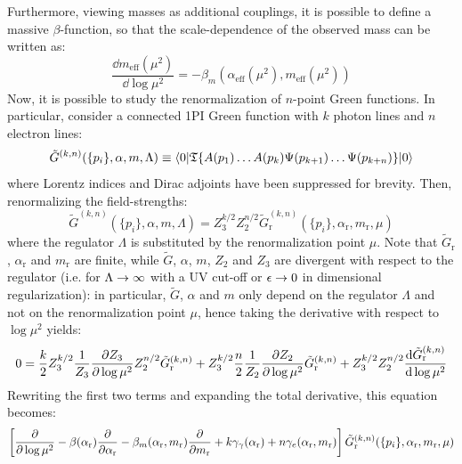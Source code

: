 Furthermore, viewing masses as additional couplings, it is possible to define a massive $ \beta $-function, so that the scale-dependence of the observed mass can be written as:
\begin{equation}
  \frac{\dd m_\text{eff}(\mu^2)}{\dd \log \mu^2} = - \beta_m(\alpha_\text{eff}(\mu^2) , m_\text{eff}(\mu^2))
\end{equation}
Now, it is possible to study the renormalization of $ n $-point Green functions. In particular, consider a connected 1PI Green function with $ k $ photon lines and $ n $ electron lines:
\begin{equation*}
  \tilde{G}^{(k,n)}(\{p_i\} , \alpha , m , \Lambda) \equiv \braket{0 | \mathfrak{T}\{A(p_1) \dots A(p_k) \Psi(p_{k + 1}) \dots \Psi(p_{k + n}) \} | 0}
\end{equation*}
where Lorentz indices and Dirac adjoints have been suppressed for brevity. Then, renormalizing the field-strengths:
\begin{equation*}
  \tilde{G}^{(k,n)}(\{p_i\} , \alpha , m , \Lambda) = Z_3^{k/2} Z_2^{n/2} \tilde{G}_\text{r}^{(k,n)}(\{p_i\} , \alpha_\text{r} , m_\text{r} , \mu)
\end{equation*}
where the regulator $ \Lambda $ is substituted by the renormalization point $ \mu $. Note that $ \tilde{G}_\text{r} $, $ \alpha_\text{r} $ and $ m_\text{r} $ are finite, while $ \tilde{G} $, $ \alpha $, $ m $, $ Z_2 $ and $ Z_3 $ are divergent with respect to the regulator (i.e. for $ \Lambda \rightarrow \infty $ with a UV cut-off or $ \epsilon \rightarrow 0 $ in dimensional regularization): in particular, $ \tilde{G} $, $ \alpha $ and $ m $ only depend on the regulator $ \Lambda $ and not on the renormalization point $ \mu $, hence taking the derivative with respect to $ \log \mu^2 $ yields:
\begin{equation*}
  0 = \frac{k}{2} Z_3^{k/2} \frac{1}{Z_3} \frac{\partial Z_3}{\partial \log \mu^2} Z_2^{n/2} \tilde{G}_\text{r}^{(k,n)} + Z_3^{k/2} \frac{n}{2} \frac{1}{Z_2} \frac{\partial Z_2}{\partial \log \mu^2} \tilde{G}_\text{r}^{(k,n)} + Z_3^{k/2} Z_2^{n/2} \frac{\mathrm{d} \tilde{G}_\text{r}^{(k,n)}}{\mathrm{d} \log \mu^2}
\end{equation*}
Rewriting the first two terms and expanding the total derivative, this equation becomes:
\begin{equation}
  \left[ \frac{\partial}{\partial \log \mu^2} - \beta(\alpha_\text{r}) \frac{\partial}{\partial \alpha_\text{r}} - \beta_m(\alpha_\text{r} , m_\text{r}) \frac{\partial}{\partial m_\text{r}} + k \gamma_\gamma(\alpha_\text{r}) + n \gamma_e(\alpha_\text{r} , m_\text{r}) \right] \tilde{G}_\text{r}^{(k,n)}(\{p_i\} , \alpha_\text{r} , m_\text{r} , \mu)
\end{equation}
